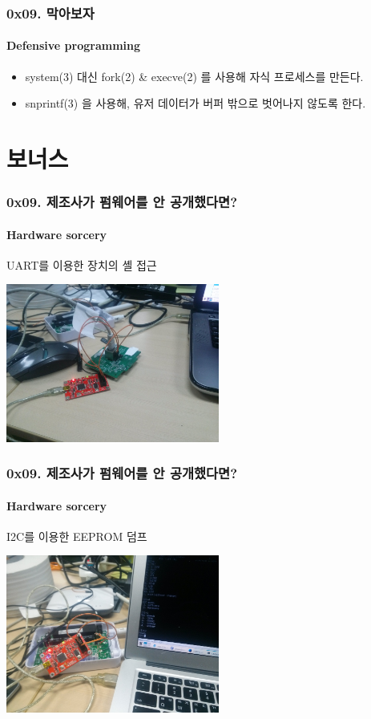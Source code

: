 \documentclass {beamer}
\begin{document}
\begin{frame}
  \frametitle{0x09. 막아보자}
  \framesubtitle{Defensive programming}

  \begin{itemize}
  \item<1->system(3) 대신 fork(2) \& execve(2) 를 사용해 자식 프로세스를 만든다.
  \item<2->snprintf(3) 을 사용해, 유저 데이터가 버퍼 밖으로 벗어나지 않도록 한다.
  \end{itemize}
\end{frame}

\section[Section]{보너스}

\begin{frame}
  \frametitle{0x09. 제조사가 펌웨어를 안 공개했다면?}
  \framesubtitle{Hardware sorcery}

  \begin{center}
    UART를 이용한 장치의 셸 접근

    \includegraphics [width=70mm]{img/wrt-uart.jpeg}
  \end{center}
\end{frame}

\begin{frame}
  \frametitle{0x09. 제조사가 펌웨어를 안 공개했다면?}
  \framesubtitle{Hardware sorcery}

  \begin{center}
    I2C를 이용한 EEPROM 덤프

    \includegraphics [width=70mm]{img/wrt-i2c.jpeg}
  \end{center}
\end{frame}
\end{document}
